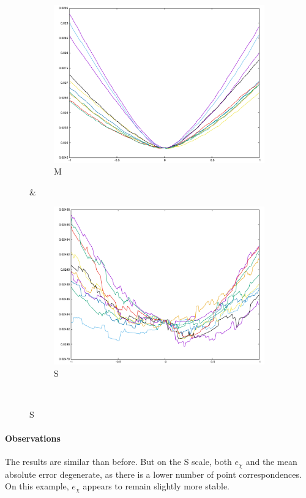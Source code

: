 {\begin{figure}[H]
\begin{subfigure}{.33\textwidth}
	\includegraphics[width=\linewidth]{fig/ajherr/t2/M_mae.pdf}
	\caption{M}
\end{subfigure}&
\begin{subfigure}{.33\textwidth}
	\includegraphics[width=\linewidth]{fig/ajherr/t2/S_mae.pdf}
	\caption{S}
\end{subfigure}\\
\end{figure}

\paragraph{Observations} The results are similar than before. But on the S scale, both $e_{\chi}$ and the mean absolute error degenerate, as there is a lower number of point correspondences. On this example, $e_{\chi}$ appears to remain slightly more stable.


}
